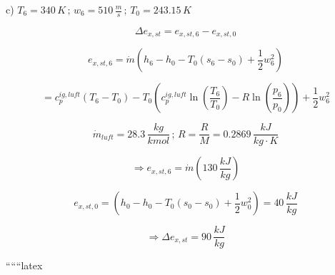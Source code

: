 c) $T_6 = 340 \, K \, ; \, w_6 = 510 \, \frac{m}{s} \, ; \, T_0 = 243.15 \, K$

\[
\Delta e_{x,st} = e_{x,st,6} - e_{x,st,0}
\]

\[
e_{x,st,6} = \dot{m} \left( h_6 - h_0 - T_0 (s_6 - s_0) + \frac{1}{2} w_6^2 \right)
\]

\[
= c_p^{ig,luft} (T_6 - T_0) - T_0 \left( c_p^{ig,luft} \ln \left( \frac{T_6}{T_0} \right) - R \ln \left( \frac{p_6}{p_0} \right) \right) + \frac{1}{2} w_6^2
\]

\[
\dot{m}_{luft} = 28.3 \, \frac{kg}{kmol} \, ; \, R = \frac{R}{M} = 0.2869 \, \frac{kJ}{kg \cdot K}
\]

\[
\Rightarrow e_{x,st,6} = \dot{m} \left( 130 \, \frac{kJ}{kg} \right)
\]

\[
e_{x,st,0} = \left( h_0 - h_0 - T_0 (s_0 - s_0) + \frac{1}{2} w_0^2 \right) = 40 \, \frac{kJ}{kg}
\]

\[
\Rightarrow \Delta e_{x,st} = 90 \, \frac{kJ}{kg}
\]

``````latex